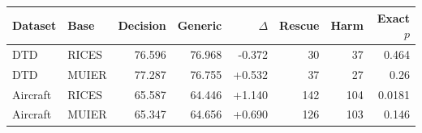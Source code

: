 \begin{tabular}{llrrrrrr}
\toprule
Dataset & Base & Decision & Generic & $\Delta$ & Rescue & Harm & Exact $p$ \\
\midrule
DTD & RICES & 76.596 & 76.968 & -0.372 & 30 & 37 & 0.464 \\
DTD & MUIER & 77.287 & 76.755 & +0.532 & 37 & 27 & 0.26 \\
Aircraft & RICES & 65.587 & 64.446 & +1.140 & 142 & 104 & 0.0181 \\
Aircraft & MUIER & 65.347 & 64.656 & +0.690 & 126 & 103 & 0.146 \\
\bottomrule
\end{tabular}
